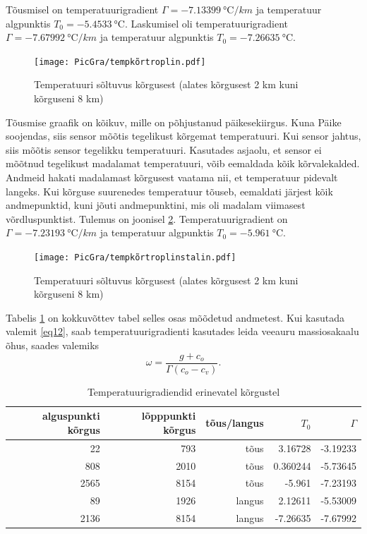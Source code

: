 \documentclass{trkut}%
\begin{document}
Tõusmisel on temperatuurigradient $\Gamma =\SI{-7.13399}{\degreeCelsius/km}$ ja temperatuur algpunktis $T_0 = \SI{-5.4533}{\celsius}$. Laskumisel oli temperatuurigradient $\Gamma =\SI{-7.67992}{\degreeCelsius/km}$ ja temperatuur algpunktis $T_0 = \SI{-7.26635}{\celsius}$.

\begin{figure}[h]
	\texttt{[image: PicGra/tempkõrtroplin.pdf]}
	\caption{Temperatuuri sõltuvus kõrgusest (alates kõrgusest 2 km kuni kõrguseni 8 km)}
	\label{tempkõrtroplin}%
\end{figure}

Tõusmise graafik on kõikuv, mille on põhjustanud päikesekiirgus. Kuna Päike soojendas, siis sensor mõõtis tegelikust kõrgemat temperatuuri. Kui sensor jahtus, siis mõõtis sensor tegelikku temperatuuri. Kasutades asjaolu, et sensor ei mõõtnud tegelikust madalamat temperatuuri, võib eemaldada kõik kõrvalekalded. Andmeid hakati madalamast kõrgusest vaatama nii, et temperatuur pidevalt langeks. Kui kõrguse suurenedes temperatuur tõuseb, eemaldati järjest kõik andmepunktid, kuni jõuti andmepunktini, mis oli madalam viimasest võrdluspunktist. Tulemus on joonisel \ref{tempkõrtroplinstalin}. Temperatuurigradient on $\Gamma =\SI{-7.23193}{\degreeCelsius/km}$ ja temperatuur algpunktis $T_0 = \SI{-5.961}{\celsius}$.

\begin{figure}[h]
	\texttt{[image: PicGra/tempkõrtroplinstalin.pdf]}
 	\caption{Temperatuuri sõltuvus kõrgusest (alates kõrgusest 2 km kuni kõrguseni 8 km)}
 	\label{tempkõrtroplinstalin}%
\end{figure}

Tabelis \ref{tabel1} on kokkuvõttev tabel selles osas mõõdetud andmetest. Kui kasutada valemit \ref{eq12}, saab temperatuurigradienti kasutades leida veeauru massiosakaalu õhus, saades valemiks
\begin{equation}
\omega = \frac{g + c_o}{\Gamma(c_o-c_v)}.
\end{equation}
\begin{table}[htb]
	\caption{Temperatuurigradiendid erinevatel kõrgustel}
	\label{tabel1}
	\begin{tabular}{r|r|r|r|r}
		\hline
		alguspunkti kõrgus & lõpppunkti kõrgus & tõus/langus & $T_0$ & $\Gamma$ \\
		\hline
		22 & 793 & tõus & 3.16728 & -3.19233 \\
		808 & 2010 & tõus & 0.360244 & -5.73645 \\
		2565 & 8154 & tõus & -5.961 & -7.23193 \\
		89 & 1926 & langus & 2.12611 & -5.53009 \\
		2136 & 8154 & langus & -7.26635 & -7.67992
	\end{tabular}
\end{table}
\end{document}
